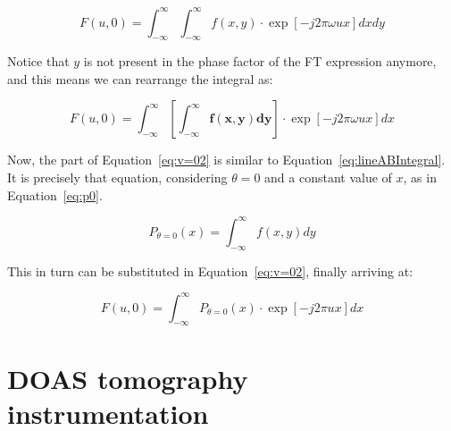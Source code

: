 \begin{equation}
    \label{eq:v=0}
    F(u, 0) = \int_{-\infty}^{\infty} \int_{-\infty}^{\infty} f(x, y)
    \cdot \exp \left[  -j 2\pi  \omega ux \right] dx dy
\end{equation}

Notice that $y$ is not present in the phase factor of the \gls{FT}
expression anymore, and this means we can rearrange the integral as:

\begin{equation}
    \label{eq:v=02}
    F(u, 0) = \int_{-\infty}^{\infty} \left[ \mathbf{\int_{-\infty}^{\infty}
    f(x, y) dy }\right] \cdot \exp \left[  -j 2\pi  \omega ux \right] dx 
\end{equation}

Now, the part of Equation~\ref{eq:v=02} is similar to
Equation~\ref{eq:lineABIntegral}. It is precisely that equation,
considering $\theta=0$ and a constant value of $x$, as in
Equation~\ref{eq:p0}.

\begin{equation}
    \label{eq:p0}
    P_{\theta=0} (x) = \int_{-\infty}^{\infty} f(x, y) dy
\end{equation}

This in turn can be substituted in Equation~\ref{eq:v=02}, finally
arriving at:

\begin{equation}
    \label{eq:FTP}
    F(u, 0) = \int_{-\infty}^{\infty} P_{\theta=0} (x) \cdot \exp \left[
    -j 2\pi ux \right] dx
\end{equation}





\section{DOAS tomography instrumentation}%
\label{sec:doas_tomography_instrumentation}










